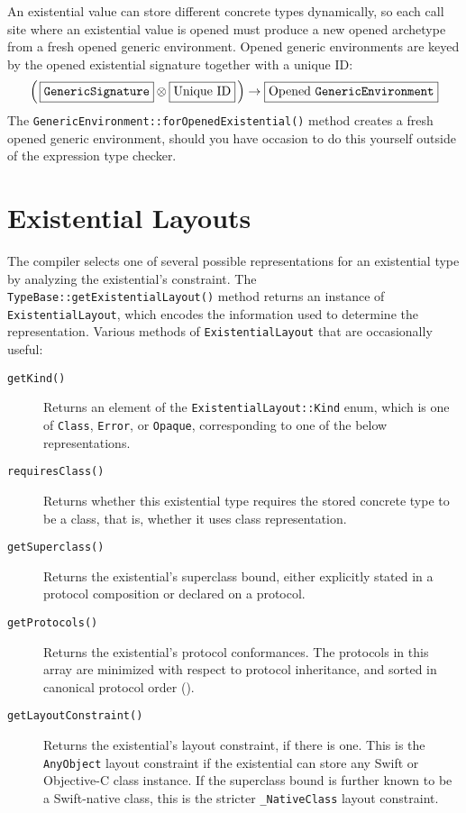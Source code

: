 \documentclass[../generics]{subfiles}
\begin{document}
An existential value can store different concrete types dynamically, so each call site where an existential value is opened must produce a new opened archetype from a fresh opened generic environment. Opened generic environments are keyed by the opened existential signature together with a unique ID:
\[\left(\,\ttbox{GenericSignature}\otimes \mathboxed{Unique ID}\,\right) \rightarrow \mathboxed{Opened \texttt{GenericEnvironment}}\]
The \texttt{GenericEnvironment::forOpenedExistential()} method creates a fresh opened generic environment, should you have occasion to do this yourself outside of the expression type checker.

\fi

\section[]{Existential Layouts}\label{existentiallayouts}

\ifWIP

The compiler selects one of several possible representations for an existential type by analyzing the existential's constraint. The \texttt{TypeBase::getExistentialLayout()} method returns an instance of \texttt{ExistentialLayout}, which encodes the information used to determine the representation. Various methods of \texttt{ExistentialLayout} that are occasionally useful:
\begin{description}
\item[\texttt{getKind()}] Returns an element of the \texttt{ExistentialLayout::Kind} enum, which is one of \texttt{Class}, \texttt{Error}, or \texttt{Opaque}, corresponding to one of the below representations.
\item[\texttt{requiresClass()}] Returns whether this existential type requires the stored concrete type to be a class, that is, whether it uses class representation.
\item[\texttt{getSuperclass()}] Returns the existential's superclass bound, either explicitly stated in a protocol composition or declared on a protocol.
\item[\texttt{getProtocols()}] Returns the existential's protocol conformances. The protocols in this array are minimized with respect to protocol inheritance, and sorted in canonical protocol order ().
\item[\texttt{getLayoutConstraint()}] Returns the existential's layout constraint, if there is one. This is the \texttt{AnyObject} layout constraint if the existential can store any Swift or Objective-C class instance. If the superclass bound is further known to be a Swift-native class, this is the stricter \texttt{\_NativeClass} layout constraint.
\end{description}
\end{document}
